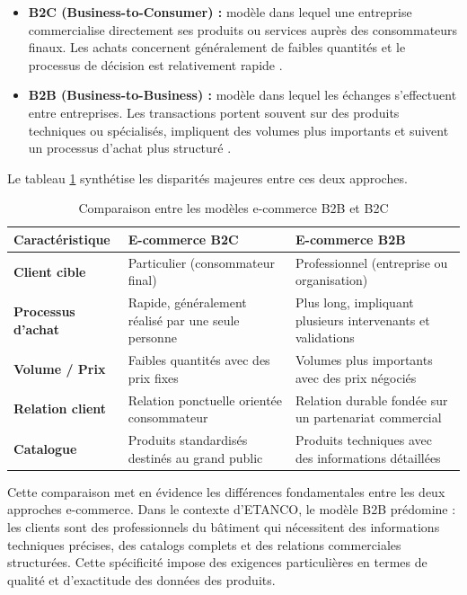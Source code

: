 \begin{itemize}
    \item \textbf{B2C (Business-to-Consumer) :} modèle dans lequel une entreprise commercialise directement ses produits ou services auprès des consommateurs finaux. Les achats concernent généralement de faibles quantités et le processus de décision est relativement rapide .

    \item \textbf{B2B (Business-to-Business) :} modèle dans lequel les échanges s'effectuent entre entreprises. Les transactions portent souvent sur des produits techniques ou spécialisés, impliquent des volumes plus importants et suivent un processus d'achat plus structuré .
\end{itemize}
\newpage
Le tableau \ref{tab:b2b_b2c} synthétise les disparités majeures entre ces deux approches.

\renewcommand{\arraystretch}{1.4}

\begin{table}[H]
    \centering
    \caption{Comparaison entre les modèles e-commerce B2B et B2C}
    \begin{tabular}{|p{3.2cm}|p{5.7cm}|p{5.7cm}|}
    \hline
    \textbf{Caractéristique} & \textbf{E-commerce B2C} & \textbf{E-commerce B2B} \\ \hline
    \textbf{Client cible} & Particulier (consommateur final) & Professionnel (entreprise ou organisation) \\ \hline
    \textbf{Processus d'achat} & Rapide, généralement réalisé par une seule personne & Plus long, impliquant plusieurs intervenants et validations \\ \hline
    \textbf{Volume / Prix} & Faibles quantités avec des prix fixes & Volumes plus importants avec des prix négociés \\ \hline
    \textbf{Relation client} & Relation ponctuelle orientée consommateur & Relation durable fondée sur un partenariat commercial \\ \hline
    \textbf{Catalogue} & Produits standardisés destinés au grand public & Produits techniques avec des informations détaillées \\ \hline
    \end{tabular}
    
    \label{tab:b2b_b2c}
\end{table}

\renewcommand{\arraystretch}{1}
Cette comparaison met en évidence les différences fondamentales entre les deux approches e-commerce. Dans le contexte d'ETANCO, le modèle B2B prédomine : les clients sont des professionnels du bâtiment qui nécessitent des informations techniques précises, des catalogs complets et des relations commerciales structurées. Cette spécificité impose des exigences particulières en termes de qualité et d'exactitude des données des produits.

